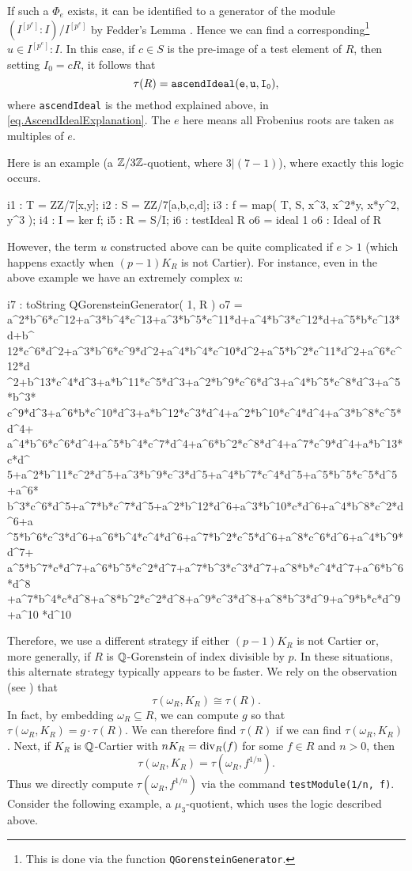 \documentclass{amsart}
\newcommand{\pedro}[2][]
{\todo[linecolor=blue,backgroundcolor=blue!10,caption={}, #1]{#2}}
\begin{document}
If such a $\Phi_e$ exists, it can be identified to a generator of the module $(I^{[p^e]} : I) / I^{[p^e]}$ by Fedder's Lemma \cite{FedderFPureRat}.  Hence we can find a corresponding\footnote{This is done via the function \texttt{QGorensteinGenerator}. } $u \in I^{[p^e]} : I$.  In this case, if $c \in S$ is the pre-image of a test element of $R$, then setting $I_0 = cR$, it follows that
\[
\tau(R) = {\tt ascendIdeal(e, u, I_0)},
\]
where \texttt{ascendIdeal} is the method explained above, in \autoref{eq.AscendIdealExplanation}.
The $e$ here means all Frobenius roots are taken as multiples of $e$.
%
\pedro{I am not sure what this last sentence is saying}
%

Here is an example (a $\mathbb{Z}/3\mathbb{Z}$-quotient, where $3 | (7-1)$), where exactly this logic occurs.

\medskip
{\small
\begin{MyVerbatim}
i1 : T = ZZ/7[x,y];
i2 : S = ZZ/7[a,b,c,d];
i3 : f = map( T, S, { x^3, x^2*y, x*y^2, y^3 } );
i4 : I = ker f;
i5 : R = S/I;
i6 : testIdeal R
o6 = ideal 1
o6 : Ideal of R
\end{MyVerbatim}
}\medskip

However, the term $u$ constructed above can be quite complicated if $e > 1$ (which happens exactly when $(p -1)K_R$ is not Cartier).  For instance, even in the above example we have an extremely complex $u$:

\medskip
{\small
\begin{MyVerbatim}
i7 : toString QGorensteinGenerator( 1, R )
o7 = a^2*b^6*c^12+a^3*b^4*c^13+a^3*b^5*c^11*d+a^4*b^3*c^12*d+a^5*b*c^13*d+b^
     12*c^6*d^2+a^3*b^6*c^9*d^2+a^4*b^4*c^10*d^2+a^5*b^2*c^11*d^2+a^6*c^12*d
     ^2+b^13*c^4*d^3+a*b^11*c^5*d^3+a^2*b^9*c^6*d^3+a^4*b^5*c^8*d^3+a^5*b^3*
     c^9*d^3+a^6*b*c^10*d^3+a*b^12*c^3*d^4+a^2*b^10*c^4*d^4+a^3*b^8*c^5*d^4+
     a^4*b^6*c^6*d^4+a^5*b^4*c^7*d^4+a^6*b^2*c^8*d^4+a^7*c^9*d^4+a*b^13*c*d^
     5+a^2*b^11*c^2*d^5+a^3*b^9*c^3*d^5+a^4*b^7*c^4*d^5+a^5*b^5*c^5*d^5+a^6*
     b^3*c^6*d^5+a^7*b*c^7*d^5+a^2*b^12*d^6+a^3*b^10*c*d^6+a^4*b^8*c^2*d^6+a
     ^5*b^6*c^3*d^6+a^6*b^4*c^4*d^6+a^7*b^2*c^5*d^6+a^8*c^6*d^6+a^4*b^9*d^7+
     a^5*b^7*c*d^7+a^6*b^5*c^2*d^7+a^7*b^3*c^3*d^7+a^8*b*c^4*d^7+a^6*b^6*d^8
     +a^7*b^4*c*d^8+a^8*b^2*c^2*d^8+a^9*c^3*d^8+a^8*b^3*d^9+a^9*b*c*d^9+a^10
     *d^10
\end{MyVerbatim}
}\medskip

Therefore, we use a different strategy if either $(p-1)K_R$ is not Cartier or, more generally, if $R$ is $\mathbb{Q}$-Gorenstein of index divisible by $p$.
In these situations, this alternate strategy typically appears to be faster.  We rely on the observation (see \cite{BlickleSchwedeTuckerTestAlterations}) that
\[
\tau(\omega_R, K_R) \cong \tau(R).
\]
In fact, by embedding $\omega_R \subseteq R$, we can compute $g$ so that $\tau(\omega_R, K_R) = g\cdot \tau(R)$.  We can therefore find $\tau(R)$ if we can find $\tau(\omega_R, K_R)$.
Next, if $K_R$ is $\mathbb{Q}$-Cartier with $nK_R = \operatorname{{div}}_R(f)$ for some $f \in R$ and $n > 0$, then
\[
\tau(\omega_R, K_R) =\tau(\omega_R, f^{1/n}).
\]
Thus we directly compute $\tau(\omega_R, f^{1/n})$ via the command \texttt{testModule(1/n, f)}.  Consider the following example, a $\mu_3$-quotient, which uses the logic described above.
\end{document}
